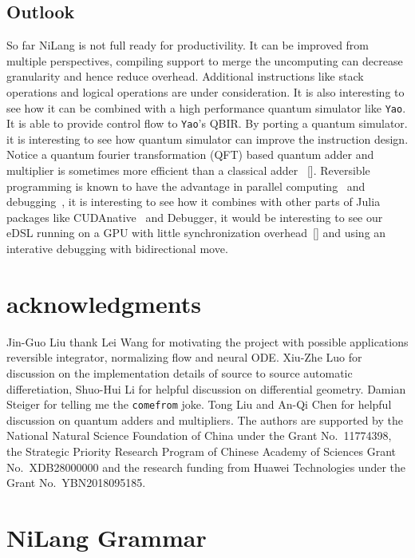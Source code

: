 \documentclass[aps,twocolumn,longbibliography,english,superscriptaddress,prr]{revtex4-1}
\newcommand{\<}{\langle}
\renewcommand{\>}{\rangle}
\newcommand{\blue}[1]{[{\bf  \color{blue}{JG: #1}}]}
\theoremstyle{definition}\newtheorem{definition}{\textit{Definition}}
\begin{document}
\subsection{Outlook}\label{sec:outlook}
So far NiLang is not full ready for productivility. It can be improved from multiple perspectives, compiling support to merge the uncomputing can decrease granularity and hence reduce overhead. Additional instructions like stack operations and logical operations are under consideration. It is also interesting to see how it can be combined with a high performance quantum simulator like \texttt{Yao}. It is able to provide control flow to \texttt{Yao}'s QBIR. By porting a quantum simulator. it is interesting to see how quantum simulator can improve the instruction design. Notice a quantum fourier transformation (QFT) based quantum adder and multiplier is sometimes more efficient than a classical adder~\cite{Haener2018} \blue{Is this true?}.
Reversible programming is known to have the advantage in parallel computing~\cite{Jefferson1985} and debugging~\cite{Boothe2000}, it is interesting to see how it combines with other parts of Julia packages like CUDAnative~\cite{Besard2018} and Debugger, it would be interesting to see our eDSL running on a GPU with little synchronization overhead~\blue{Is this even possible?} and using an interative debugging with bidirectional move.

\section{acknowledgments}
Jin-Guo Liu thank Lei Wang for motivating the project with possible applications reversible integrator, normalizing flow and neural ODE.
Xiu-Zhe Luo for discussion on the implementation details of source to source automatic differetiation,
Shuo-Hui Li for helpful discussion on differential geometry.
Damian Steiger for telling me the \texttt{comefrom} joke.
Tong Liu and An-Qi Chen for helpful discussion on quantum adders and multipliers.
The authors are supported by the National Natural Science Foundation of China under the Grant No.~11774398, the Strategic Priority Research Program of Chinese Academy of Sciences Grant No.~XDB28000000 and the research funding from Huawei Technologies under the Grant No.~YBN2018095185.




\pagebreak
\appendix

\section{NiLang Grammar}\label{app:grammar}
\end{document}
